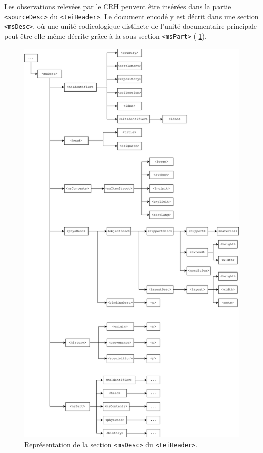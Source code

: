 Les observations relevées par le CRH peuvent être insérées dans la partie \texttt{<sourceDesc>} du \texttt{<teiHeader>}. Le document encodé y est décrit dans une section \texttt{<msDesc>}, où une unité codicologique distincte de l'unité documentaire principale peut être elle-même décrite grâce à la sous-section \texttt{<msPart>} (\fig{} \ref{fig:tree_msDesc}).

\begin{figure}
    \centering
    \includegraphics[scale=0.625]{img/tree_msDesc.png}
    \caption{Représentation de la section \texttt{<msDesc>} du \texttt{<teiHeader>}.}
    \label{fig:tree_msDesc}
\end{figure}

